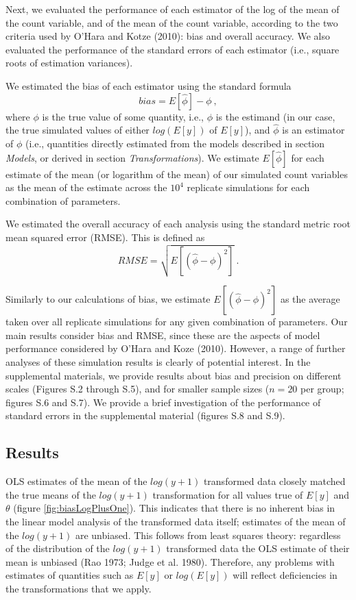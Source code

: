 \documentclass[]{article}
\begin{document}
Next, we evaluated the performance of each estimator of the log of the
mean of the count variable, and of the mean of the count variable,
according to the two criteria used by O'Hara and Kotze (2010): bias and
overall accuracy. We also evaluated the performance of the standard
errors of each estimator (i.e., square roots of estimation variances).

We estimated the bias of each estimator using the standard formula \[
bias = E[\hat{\phi}]-\phi ~,
\] where \(\phi\) is the true value of some quantity, i.e., \(\phi\) is
the estimand (in our case, the true simulated values of either
\(log(E[y])\) of \(E[y]\)), and \(\hat{\phi}\) is an estimator of
\(\phi\) (i.e., quantities directly estimated from the models described
in section \emph{Models}, or derived in section \emph{Transformations}).
We estimate \(E[\hat{\phi}]\) for each estimate of the mean (or
logarithm of the mean) of our simulated count variables as the mean of
the estimate across the \(10^4\) replicate simulations for each
combination of parameters.

We estimated the overall accuracy of each analysis using the standard
metric root mean squared error (RMSE). This is defined as \[
RMSE = \sqrt{E[(\hat{\phi}-\phi)^2]} ~.
\]

Similarly to our calculations of bias, we estimate
\(E[(\hat{\phi}-\phi)^2]\) as the average taken over all replicate
simulations for any given combination of parameters. Our main results
consider bias and RMSE, since these are the aspects of model performance
considered by O'Hara and Koze (2010). However, a range of further
analyses of these simulation results is clearly of potential interest.
In the supplemental materials, we provide results about bias and
precision on different scales (Figures S.2 through S.5), and for smaller
sample sizes (\(n = 20\) per group; figures S.6 and S.7). We provide a
brief investigation of the performance of standard errors in the
supplemental material (figures S.8 and S.9).

\subsection{Results}\label{results}

OLS estimates of the mean of the \(log(y+1)\) transformed data closely
matched the true means of the \(log(y+1)\) transformation for all values
true of \(E[y]\) and \(\theta\) (figure \ref{fig:biasLogPlusOne}). This
indicates that there is no inherent bias in the linear model analysis of
the transformed data itself; estimates of the mean of the \(log(y+1)\)
are unbiased. This follows from least squares theory: regardless of the
distribution of the \(log(y+1)\) transformed data the OLS estimate of
their mean is unbiased (Rao 1973; Judge et al. 1980). Therefore, any
problems with estimates of quantities such as \(E[y]\) or \(log(E[y])\)
will reflect deficiencies in the transformations that we apply.
\end{document}
